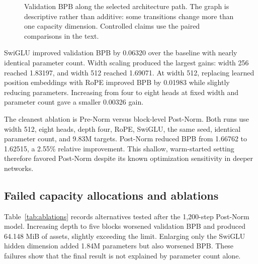 \documentclass[10pt]{article}
\begin{document}
\begin{figure}[t]
\centering
{}
\caption{Validation BPB along the selected architecture path. The graph is descriptive rather than additive: some transitions change more than one capacity dimension. Controlled claims use the paired comparisons in the text.}
\label{fig:path}
\end{figure}

SwiGLU improved validation BPB by 0.06320 over the baseline with nearly identical parameter count. Width scaling produced the largest gains: width 256 reached 1.83197, and width 512 reached 1.69071. At width 512, replacing learned position embeddings with RoPE improved BPB by 0.01983 while slightly reducing parameters. Increasing from four to eight heads at fixed width and parameter count gave a smaller 0.00326 gain.

The cleanest ablation is Pre-Norm versus block-level Post-Norm. Both runs use width 512, eight heads, depth four, RoPE, SwiGLU, the same seed, identical parameter count, and 9.83M targets. Post-Norm reduced BPB from 1.66762 to 1.62515, a 2.55\% relative improvement. This shallow, warm-started setting therefore favored Post-Norm despite its known optimization sensitivity in deeper networks.

\subsection{Failed capacity allocations and ablations}

Table~\ref{tab:ablations} records alternatives tested after the 1,200-step Post-Norm model. Increasing depth to five blocks worsened validation BPB and produced 64.148 MiB of assets, slightly exceeding the limit. Enlarging only the SwiGLU hidden dimension added 1.84M parameters but also worsened BPB. These failures show that the final result is not explained by parameter count alone.
\end{document}
